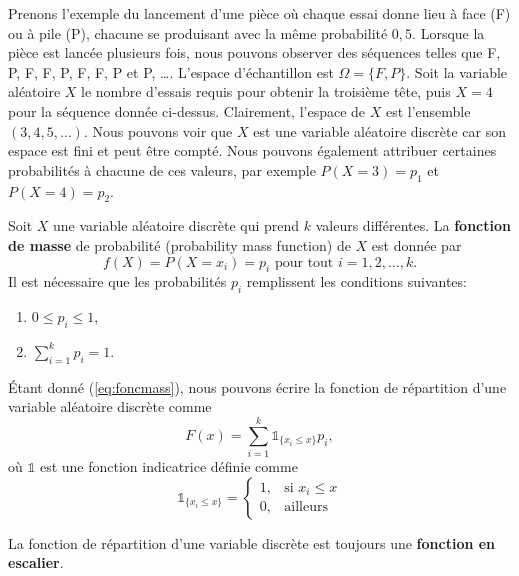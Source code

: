 \begin{example}\label{exemple:2}
Prenons l'exemple du lancement d'une pièce où chaque essai donne lieu à face (F) ou à pile (P), chacune se produisant
avec la même probabilité $0,5$. Lorsque la pièce est lancée plusieurs fois, nous pouvons observer des séquences telles
que F, P, F, F, P, F, F, P et P, \dots. L'espace d'échantillon est $\Omega = \{F, P\}$. Soit la variable aléatoire $X$ le
nombre d'essais requis pour obtenir la troisième tête, puis $X = 4$ pour la séquence donnée ci-dessus.
Clairement, l'espace de $X$ est l'ensemble $(3,4,5, \dots)$. Nous pouvons voir que $X$ est une variable aléatoire
discrète car son espace est fini et peut être compté. Nous pouvons également attribuer certaines probabilités à
chacune de ces valeurs, par exemple $P (X = 3) = p_1$ et $P (X = 4) = p_2$.
\end{example}

\theoremstyle{definition}
\begin{definition}
Soit $X$ une variable aléatoire discrète qui prend $k$ valeurs différentes.
La \textbf{fonction de masse} de probabilité (probability mass function) de $X$ est donnée par
\begin{equation}\label{eq:foncmass}
f(X) = P(X = x_i)=p_i \text{ pour tout } i=1,2,\dots,k.
\end{equation}
Il est nécessaire que les probabilités $p_i$ remplissent les conditions suivantes:
\begin{enumerate}
\item $0\leq p_i\leq1$,
\item $\sum_{i=1}^{k}p_i=1$.
\end{enumerate}
\end{definition}

\theoremstyle{definition}
\begin{definition}
Étant donné (\ref{eq:foncmass}), nous pouvons écrire la fonction de répartition d'une variable aléatoire discrète comme
\begin{equation}\label{eq:frvd}
F(x)=\sum_{i=1}^{k} \mathds{1}_{\{x_i \leq x\}}p_i,
\end{equation}
où $\mathds{1}$ est une fonction indicatrice définie comme
$$\mathds{1}_{\{x_i \leq x\}} = \begin{cases} 1, & \mbox{si   } x_i\leq x\\ 0, & \mbox{ailleurs } \end{cases}$$
\end{definition}

La fonction de répartition d'une variable discrète est toujours une \textbf{fonction en escalier}.\\


